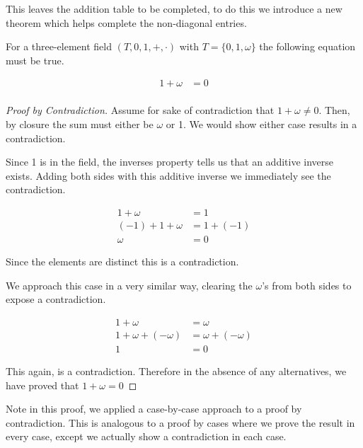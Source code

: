 This leaves the addition table to be completed, to do this we introduce a new theorem which helps complete the non-diagonal entries.

\vspace{\baselineskip}
\begin{theorem}
	For a three-element field $(T, 0, 1, +, \cdot)$ with $T = \{ 0, 1, \omega \}$ the following equation must be true.
	
	\begin{align*}
		1 + \omega &= 0 \\
	\end{align*}
\end{theorem}

\begin{proof}[Proof by Contradiction]
	Assume for sake of contradiction that $1 + \omega \neq 0$. Then, by closure the sum must either be $\omega$ or 1. We would show either case results in a contradiction.
	
	
	Since 1 is in the field, the inverses property tells us that an additive inverse exists. Adding both sides with this additive inverse we immediately see the contradiction.
	
	\begin{align*}
		1 + \omega &= 1 \\
		(-1) + 1 + \omega &= 1 + (-1) \\
		\omega &= 0
	\end{align*}
	
	Since the elements are distinct this is a contradiction.

	
	We approach this case in a very similar way, clearing the $\omega$'s from both sides to expose a contradiction.
	
	\begin{align*}
		1 + \omega &= \omega \\
		1 + \omega + (-\omega) &= \omega + (-\omega) \\
		1 &= 0
	\end{align*}
	
	This again, is a contradiction. Therefore in the absence of any alternatives, we have proved that $1 + \omega = 0$
\end{proof}
\vspace{\baselineskip}

Note in this proof, we applied a case-by-case approach to a proof by contradiction. This is analogous to a proof by cases where we prove the result in every case, except we actually show a contradiction in each case.

